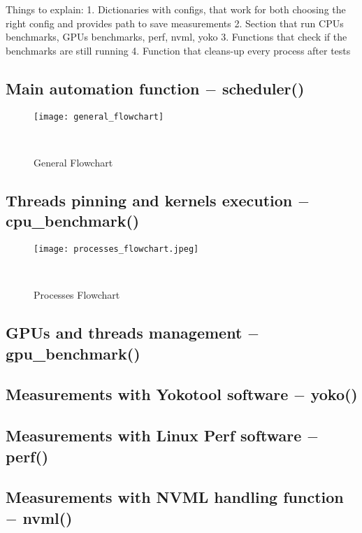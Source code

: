 Things to explain:
1. Dictionaries with configs, that work for both choosing the right config and
provides path to save measurements
2. Section that run CPUs benchmarks, GPUs benchmarks, perf, nvml, yoko
3. Functions that check if the benchmarks are still running
4. Function that cleans-up every process after tests


\subsection{Main automation function $-$ scheduler()}


\begin{figure}[hbtp]
    \centering
    \texttt{[image: general\_flowchart]}
    \caption{General Flowchart}~\label{fig:general_flowchart}
\end{figure}


\subsection{Threads pinning and kernels execution $-$ cpu\_benchmark()}

\begin{figure}[hbtp]
    \centering
    \texttt{[image: processes\_flowchart.jpeg]}
    \caption{Processes Flowchart}~\label{fig:processes_flowchart}
\end{figure}


\subsection{GPUs and threads management $-$ gpu\_benchmark\@()}

\subsection{Measurements with Yokotool software $-$ yoko\@()}

\subsection{Measurements with Linux Perf software $-$ perf\@()}

\subsection{Measurements with NVML handling function $-$ nvml\@()}

